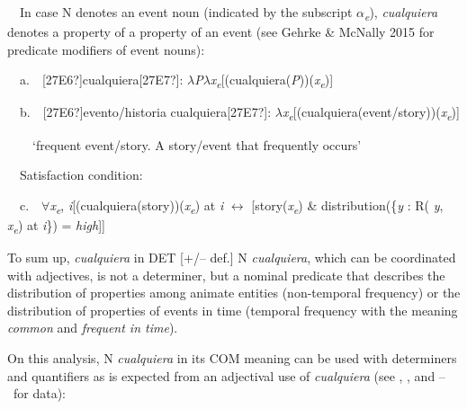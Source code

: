 \begin{styleStandard}
\ \ In case N denotes an event noun (indicated by the subscript $\alpha $\textit{\textsubscript{e}}), \textit{cualquiera} denotes a property of a property of an event (see Gehrke \& McNally 2015 for predicate modifiers of event nouns):
\end{styleStandard}

\begin{styleStandard}
\ \ a.\ \ [27E6?]cualquiera[27E7?]: $\lambda $\textit{P}$\lambda $\textit{x}\textit{\textsubscript{e}}[(cualquiera(\textit{P}))(\textit{x}\textit{\textsubscript{e}})]
\end{styleStandard}

\begin{styleStandard}
\ \ b.\ \ [27E6?]evento/historia cualquiera[27E7?]: $\lambda $\textit{x}\textit{\textsubscript{e}}[(cualquiera(event/story))(\textit{x}\textit{\textsubscript{e}})]
\end{styleStandard}

\begin{styleStandard}
\ \ \ \ ‘frequent event/story. A story/event that frequently occurs’
\end{styleStandard}

\begin{styleStandard}
\ \ Satisfaction condition:
\end{styleStandard}

\begin{styleStandard}
\ \ c.\ \ ${\forall}$\textit{x}\textit{\textsubscript{e}}, \textit{i}[(cualquiera(story))(\textit{x}\textit{\textsubscript{e}}) at \textit{i }$\leftrightarrow $ [story(\textit{x}\textit{\textsubscript{e}}) \& distribution(\{\textit{y }: R( \textit{y}, \textit{x}\textit{\textsubscript{e}}) at \textit{i}\}) = \textit{high}]]
\end{styleStandard}

\begin{styleStandard}
To sum up, \textit{cualquiera} in DET [+/– def.] N \textit{cualquiera}, which can be coordinated with adjectives, is not a determiner, but a nominal predicate that describes the distribution of properties among animate entities (non-temporal frequency) or the distribution of properties of events in time (temporal frequency with the meaning \textit{common} and \textit{frequent in time}).
\end{styleStandard}

\begin{styleStandard}
On this analysis, N \textit{cualquiera} in its COM meaning can be used with determiners and quantifiers as is expected from an adjectival use of \textit{cualquiera} (see , , and – \ for data):
\end{styleStandard}

